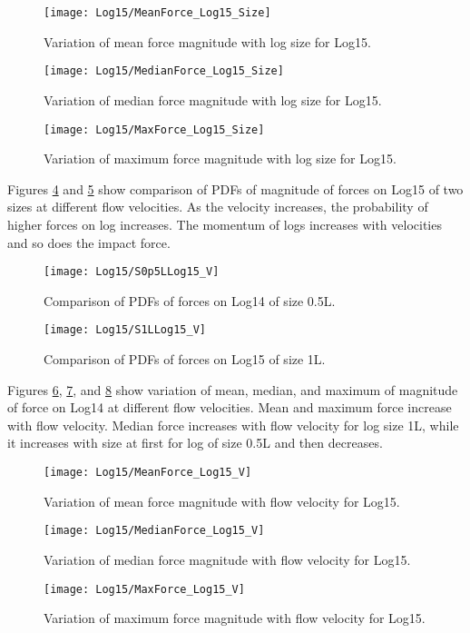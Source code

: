 \begin{figure}
\centering
\texttt{[image: Log15/MeanForce\_Log15\_Size]}
\caption{\label{fig:MeanForce_Log15_Size}Variation of mean force magnitude with log size for Log15.}
\end{figure}
\begin{figure}
\centering
\texttt{[image: Log15/MedianForce\_Log15\_Size]}
\caption{\label{fig:MedianForce_Log15_Size}Variation of median force magnitude with log size for Log15.}
\end{figure}
\begin{figure}
\centering
\texttt{[image: Log15/MaxForce\_Log15\_Size]}
\caption{\label{fig:MaxForce_Log15_Size}Variation of maximum force magnitude with log size for Log15.}
\end{figure}

\noindent Figures \ref{fig:S0p5LLog15_V} and \ref{fig:S1LLog15_V} show comparison of PDFs of magnitude of forces on Log15 of two sizes at different flow velocities. As the velocity increases, the probability of higher forces on log increases. The momentum of logs increases with velocities and so does the impact force.

\begin{figure}
\centering
\texttt{[image: Log15/S0p5LLog15\_V]}
\caption{\label{fig:S0p5LLog15_V}Comparison of PDFs of forces on Log14 of size 0.5L.}
\end{figure}
\begin{figure}
\centering
\texttt{[image: Log15/S1LLog15\_V]}
\caption{\label{fig:S1LLog15_V}Comparison of PDFs of forces on Log15 of size 1L.}
\end{figure}

\noindent Figures \ref{fig:MeanForce_Log15_V}, \ref{fig:MedianForce_Log15_V}, and \ref{fig:MaxForce_Log15_V} show variation of mean, median, and maximum of magnitude of force on Log14 at different flow velocities. Mean and maximum force increase with flow velocity. Median force increases with flow velocity for log size 1L, while it increases with size at first for log of size 0.5L and then decreases. 

\begin{figure}
\centering
\texttt{[image: Log15/MeanForce\_Log15\_V]}
\caption{\label{fig:MeanForce_Log15_V}Variation of mean force magnitude with flow velocity for Log15.}
\end{figure}
\begin{figure}
\centering
\texttt{[image: Log15/MedianForce\_Log15\_V]}
\caption{\label{fig:MedianForce_Log15_V}Variation of median force magnitude with flow velocity for Log15.}
\end{figure}
\begin{figure}
\centering
\texttt{[image: Log15/MaxForce\_Log15\_V]}
\caption{\label{fig:MaxForce_Log15_V}Variation of maximum force magnitude with flow velocity for Log15.}
\end{figure}



